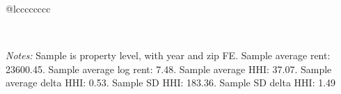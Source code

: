 \begin{table}[H]
{\begin{tabular}{@{\extracolsep{5pt}}lcccccccc}
 \hline  

 \hline \\[-1.8ex]  

  {\parbox[t]{\textwidth}{ \textit{Notes:} Sample is property level, with year and zip FE. Sample average rent: 23600.45. Sample average log rent: 7.48. Sample average HHI: 37.07. Sample average delta HHI: 0.53. Sample SD HHI: 183.36. Sample SD delta HHI: 1.49}} \\ 

 \end{tabular}}  

 \end{table}  

 




